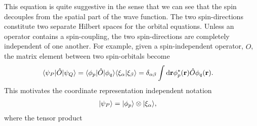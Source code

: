         This equation is quite suggestive in the sense that we can see that the
        spin decouples from the spatial part of the wave function.
        The two spin-directions constitute two separate Hilbert spaces for the
        orbital equations.
        Unless an operator contains a spin-coupling, the two spin-directions are
        completely independent of one another.
        For example, given a spin-independent operator, $\hat{O}$, the
        matrix element between two spin-orbitals become
        \begin{align}
            \langle \psi_P |\hat{O}| \psi_Q \rangle
            &= \langle \phi_p |\hat{O}| \phi_q \rangle\langle \xi_{\alpha} | \xi_{\beta} \rangle
            = \delta_{\alpha\beta}
            \int\mathrm{d}\mathbf{r}\phi^{*}_{p}(\mathbf{r})\hat{O}\phi_q(\mathbf{r}).
        \end{align}
        This motivates the coordinate representation independent notation
        \begin{align}
            | \psi_P \rangle
            &= | \phi_p \rangle\otimes| \xi_{\alpha} \rangle,
        \end{align}
        where the tensor product

